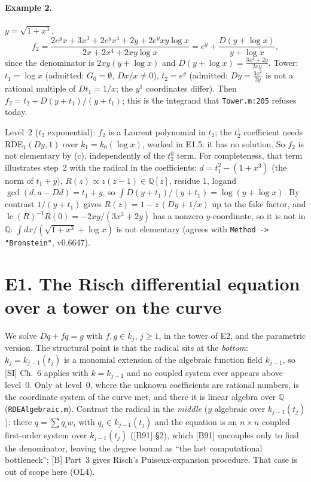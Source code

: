 \documentclass[11pt]{article}
\theoremstyle{definition}
\theoremstyle{remark}
\newcommand{\Q}{\mathbb{Q}}
\newcommand{\lc}{\operatorname{lc}}
\newcommand{\code}[1]{\texttt{#1}}
\begin{document}
\paragraph{Example 2.} $y=\sqrt{1+x^3}$,
\[ f_2=\frac{2e^yx+3x^3+2e^yx^4+2y+2e^yxy\log x}{2x+2x^4+2xy\log x}
      =e^y+\frac{D(y+\log x)}{y+\log x}, \]
since the denominator is $2xy(y+\log x)$ and $D(y+\log x)=\frac{3x^3+2y}{2xy}$. Tower:
$t_1=\log x$ (admitted: $G_0=\emptyset$, $Dx/x\ne0$), $t_2=e^y$ (admitted: $Dy=\frac{3x^2}{2y}$
is not a rational multiple of $Dt_1=1/x$; the $y^1$ coordinates differ). Then
$f_2=t_2+D(y+t_1)/(y+t_1)$; this is the integrand that \code{Tower.m:205} refuses today.

Level~2 ($t_2$ exponential): $f_2$ is a Laurent polynomial in $t_2$; the $t_2^1$ coefficient
needs RDE$_1(Dy,1)$ over $k_1=k_0(\log x)$, worked in E1.5: it has no solution. So $f_2$ is
not elementary by (c), independently of the $t_2^0$ term. For completeness, that term
illustrates step~2 with the radical in the coefficients: $d=t_1^2-(1+x^3)$ (the norm of
$t_1+y$), $R(z)\propto z(z-1)\in\Q[z]$, residue $1$, logand $\gcd(d,a-Dd)=t_1+y$, so
$\int D(y+t_1)/(y+t_1)=\log(y+\log x)$. By contrast $1/(y+t_1)$ gives $R(z)=1-z\,(Dy+1/x)$ up
to the fake factor, and $\lc(R)^{-1}R(0)=-2xy/(3x^3+2y)$ has a nonzero $y$-coordinate, so it
is not in $\Q$: $\int dx/(\sqrt{1+x^3}+\log x)$ is not elementary (agrees with
\code{Method -> "Bronstein"}, v0.6647).

\section*{E1. The Risch differential equation over a tower on the curve}
\label{sec:E1}

We solve $Dq+fq=g$ with $f,g\in k_j$, $j\ge1$, in the tower of E2, and the parametric
version. The structural point is that the radical sits at the \emph{bottom}: $k_j=k_{j-1}(t_j)$
is a monomial extension of the algebraic function field $k_{j-1}$, so [SI] Ch.~6 applies
with $k=k_{j-1}$ and no coupled system ever appears above level~0. Only at level~0, where
the unknown coefficients are rational numbers, is the coordinate system of the curve met,
and there it is linear algebra over $\Q$ (\code{RDEAlgebraic.m}). Contrast the radical in the
\emph{middle} ($y$ algebraic over $k_{j-1}(t_j)$): there $q=\sum q_iw_i$ with $q_i\in
k_{j-1}(t_j)$ and the equation is an $n\times n$ coupled first-order system over
$k_{j-1}(t_j)$ ([B91] \S2), which [B91] uncouples only to find the denominator, leaving the
degree bound as ``the last computational bottleneck''; [B] Part~3 gives Risch's
Puiseux-expansion procedure. That case is out of scope here (OL4).
\end{document}
